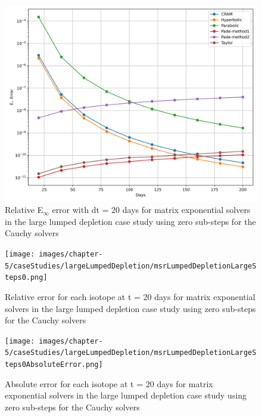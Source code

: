 \begin{figure}[p]
    \centering
    \includegraphics[width=5in]{images/chapter-5/caseStudies/largeLumpedDepletion/msrLargeLumpDepletionEinfErrorerrorSteps0.png}
    \caption{Relative E$_{\infty}$ error with dt = 20 days for matrix exponential solvers in the large lumped depletion case study using zero sub-steps for the Cauchy solvers}
    \label{fig:large_lumped_depletion_Einf_steps0}
\end{figure}

\clearpage

\begin{landscape}
\thispagestyle{mylandscape}
\begin{figure}[p]
    \centering
    \texttt{[image: images/chapter-5/caseStudies/largeLumpedDepletion/msrLumpedDepletionLargeSteps0.png]}
    \caption{Relative error for each isotope at t = 20 days for matrix exponential solvers in the large lumped depletion case study using zero sub-steps for the Cauchy solvers}
    \label{fig:large_lumped_depletion_species_relative_errors}
\end{figure}
\end{landscape}

\clearpage

\begin{landscape}
\thispagestyle{mylandscape}
\begin{figure}[p]
    \centering
    \texttt{[image: images/chapter-5/caseStudies/largeLumpedDepletion/msrLumpedDepletionLargeSteps0AbsoluteError.png]}
    \caption{Absolute error for each isotope at t = 20 days for matrix exponential solvers in the large lumped depletion case study using zero sub-steps for the Cauchy solvers}
    \label{fig:large_lumped_depletion_species_absolute_errors}
\end{figure}
\end{landscape}

